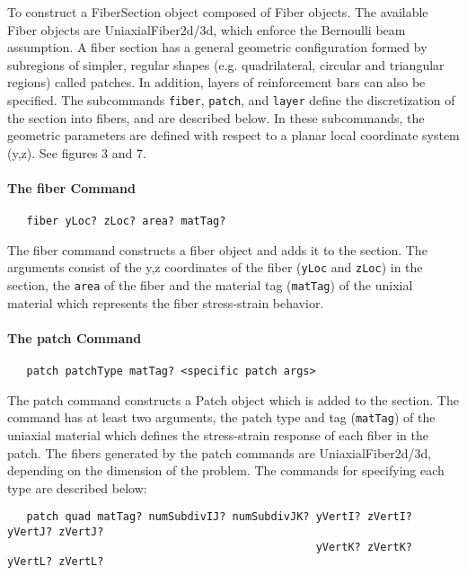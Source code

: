 \documentclass[12pt]{article}
\begin{document}
\noindent To construct a FiberSection object composed of Fiber objects.
The available Fiber objects are UniaxialFiber2d/3d, which enforce the
Bernoulli beam assumption. A fiber 
section has a general geometric configuration formed by subregions
of simpler, regular shapes (e.g. quadrilateral, circular and triangular
regions) called patches. In addition, layers of reinforcement bars 
can also be specified. The subcommands {\tt fiber}, {\tt patch}, and
{\tt layer} define the discretization of the section into
fibers, and are described below. In these subcommands, the geometric
parameters are defined with respect to a planar local coordinate system (y,z). 
See figures 3 and 7.

\paragraph{The fiber Command}

{\sf\small
\begin{verbatim}
   fiber yLoc? zLoc? area? matTag?
\end{verbatim}
}

The fiber command constructs a fiber object and adds it to
the section. The arguments consist of the y,z coordinates of the fiber
({\tt yLoc} and {\tt zLoc}) in the section, the {\tt area} of the
fiber and the material tag ({\tt matTag}) of the unixial material
which represents the fiber stress-strain behavior.

\paragraph{The patch Command}

{\sf\small
\begin{verbatim}
   patch patchType matTag? <specific patch args>
\end{verbatim}
}

The patch command constructs a Patch object which is added to the section.
The command has at least two arguments, the patch type and
tag ({\tt matTag}) of the uniaxial material which defines the
stress-strain response of each fiber in the patch. The fibers
generated by the patch commands are UniaxialFiber2d/3d, depending on
the dimension of the problem. The commands
for specifying each type are described below:

{\sf\small
\begin{verbatim}
   patch quad matTag? numSubdivIJ? numSubdivJK? yVertI? zVertI? yVertJ? zVertJ? 
                                                yVertK? zVertK? yVertL? zVertL?

\end{verbatim}
}
\end{document}
